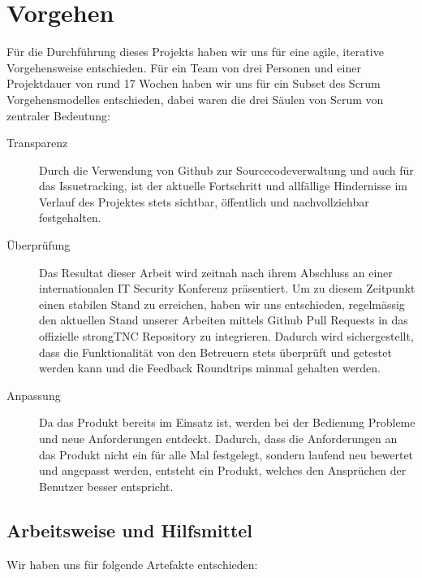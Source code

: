 \chapter{Vorgehen}

Für die Durchführung dieses Projekts haben wir uns für eine agile, iterative
Vorgehensweise entschieden. Für ein Team von drei Personen und einer
Projektdauer von rund 17 Wochen haben wir uns für ein Subset des Scrum
Vorgehensmodelles entschieden, dabei waren die drei Säulen von Scrum von
zentraler Bedeutung:

\begin{description}
	\item[Transparenz] Durch die Verwendung von Github zur Sourcecodeverwaltung und
	auch für das Issuetracking, ist der aktuelle Fortschritt und allfällige
	Hindernisse im Verlauf des Projektes stets sichtbar, öffentlich und
	nachvollziehbar festgehalten.

	\item[Überprüfung] Das Resultat dieser Arbeit wird zeitnah nach ihrem Abschluss
	an einer internationalen IT Security Konferenz präsentiert. Um zu diesem
	Zeitpunkt einen stabilen Stand zu erreichen, haben wir uns entschieden, regelmässig den aktuellen Stand unserer Arbeiten mittels Github Pull Requests
	in das offizielle strongTNC Repository zu integrieren. Dadurch wird
	sichergestellt, dass die Funktionalität von den Betreuern stets überprüft und
	getestet werden kann und die Feedback Roundtrips minmal gehalten werden.

	\item[Anpassung] Da das Produkt bereits im Einsatz ist, werden bei der
	Bedienung Probleme und neue Anforderungen entdeckt. Dadurch, dass die
	Anforderungen an das Produkt nicht ein für alle Mal festgelegt, sondern laufend
	neu bewertet und angepasst werden, entsteht ein Produkt, welches den Ansprüchen
	der Benutzer besser entspricht.

\end{description}

\section{Arbeitsweise und Hilfsmittel}
Wir haben uns für folgende Artefakte\cite{alliance2008scrum} entschieden:

